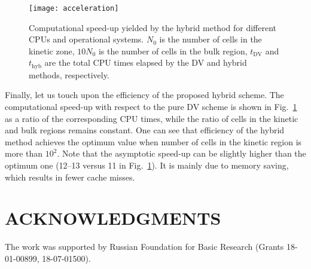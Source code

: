 \documentclass{aip-cp}
\begin{document}
\begin{figure}
    \centering
    \texttt{[image: acceleration]}
    \caption{
        Computational speed-up yielded by the hybrid method for different CPUs and operational systems.
        $N_0$ is the number of cells in the kinetic zone, $10N_0$ is the number of cells in the bulk region,
        $t_\mathrm{DV}$ and $t_\mathrm{hyb}$ are the total CPU times elapsed by the DV and hybrid methods, respectively.
    }\label{fig:speed-up}
\end{figure}

Finally, let us touch upon the efficiency of the proposed hybrid scheme.
The computational speed-up with respect to the pure DV scheme is shown in Fig.~\ref{fig:speed-up} as a ratio of the corresponding CPU times,
while the ratio of cells in the kinetic and bulk regions remains constant.
One can see that efficiency of the hybrid method achieves the optimum value when number of cells in the kinetic region is more than $10^2$.
Note that the asymptotic speed-up can be slightly higher than the optimum one (12--13 versus 11 in Fig.~\ref{fig:speed-up}).
It is mainly due to memory saving, which results in fewer cache misses.

\section{ACKNOWLEDGMENTS}
The work was supported by Russian Foundation for Basic Research (Grants 18-01-00899, 18-07-01500).

%
%
\end{document}
